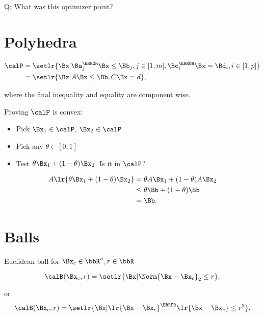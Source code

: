Q: What was this optimizer point?

\section{Polyhedra}

\begin{equation}\label{eqn:convexOptimizationLecture4:120}
\begin{aligned}
\calP 
&= \setlr{ \Bx |
\Ba_j^\T \Bx \le \Bb_j, j \in [1,m],
\Bc_i^\T \Bx = \Bd_i, i \in [1,p]
} \\
&=
\setlr{ \Bx | A \Bx \le \Bb, C \Bx = d },
\end{aligned}
\end{equation}

where the final inequality and equality are component wise.

Proving \( \calP \) is convex:

\begin{itemize}
\item Pick \(\Bx_1 \in \calP\), \(\Bx_2 \in \calP \)
\item Pick any \(\theta \in [0,1]\)
\item Test \( \theta \Bx_1 + (1-\theta) \Bx_2 \).  Is it in \(\calP\)?
\end{itemize}

\begin{dmath}\label{eqn:convexOptimizationLecture4:140}
\begin{aligned}
A \lr{ \theta \Bx_1 + (1-\theta) \Bx_2 }
&=
\theta A \Bx_1 + (1-\theta) A \Bx_2 \\
&\le
\theta \Bb + (1-\theta) \Bb \\
&=
\Bb.
\end{aligned}
\end{dmath}

\section{Balls}

Euclidean ball for \( \Bx_c \in \bbR^n, r \in \bbR \)

\begin{equation}\label{eqn:convexOptimizationLecture4:160}
\calB(\Bx_c, r)
= \setlr{ \Bx | \Norm{\Bx - \Bx_c}_2 \le r },
\end{equation}

or
\begin{equation}\label{eqn:convexOptimizationLecture4:180}
\calB(\Bx_c, r)
= \setlr{ \Bx | \lr{\Bx - \Bx_c}^\T \lr{\Bx - \Bx_c} \le r^2 }.
\end{equation}

